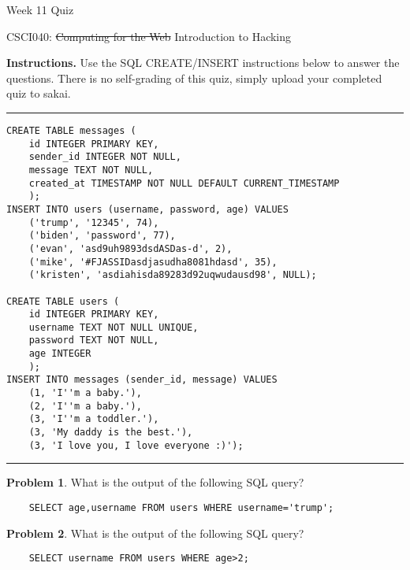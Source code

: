 \documentclass[10pt]{article}
\theoremstyle{definition}
\newtheorem{problem}{Problem}
\begin{document}
\begin{center}
    {
\Large
Week 11 Quiz
}

    \vspace{0.1in}
    CSCI040: \sout{Computing for the Web} Introduction to Hacking

    \vspace{0.1in}
\end{center}

\vspace{0.15in}
%
%

\noindent\textbf{Instructions.}
Use the SQL CREATE/INSERT instructions below to answer the questions.
There is no self-grading of this quiz,
simply upload your completed quiz to sakai.

\noindent
\rule{\textwidth}{1pt}
\begin{lstlisting}
CREATE TABLE messages (
    id INTEGER PRIMARY KEY,
    sender_id INTEGER NOT NULL,
    message TEXT NOT NULL,
    created_at TIMESTAMP NOT NULL DEFAULT CURRENT_TIMESTAMP
    );
INSERT INTO users (username, password, age) VALUES 
    ('trump', '12345', 74),
    ('biden', 'password', 77),
    ('evan', 'asd9uh9893dsdASDas-d', 2),
    ('mike', '#FJASSIDasdjasudha8081hdasd', 35),
    ('kristen', 'asdiahisda89283d92uqwudausd98', NULL);

CREATE TABLE users (
    id INTEGER PRIMARY KEY,
    username TEXT NOT NULL UNIQUE,
    password TEXT NOT NULL,
    age INTEGER
    );
INSERT INTO messages (sender_id, message) VALUES 
    (1, 'I''m a baby.'),
    (2, 'I''m a baby.'),
    (3, 'I''m a toddler.'),
    (3, 'My daddy is the best.'),
    (3, 'I love you, I love everyone :)');
\end{lstlisting}
\rule{\textwidth}{1pt}

\begin{problem}
    What is the output of the following SQL query?
    \begin{lstlisting}
    SELECT age,username FROM users WHERE username='trump';
    \end{lstlisting}
    \vspace{1in}
\end{problem}

\begin{problem}
    What is the output of the following SQL query?
    \begin{lstlisting}
    SELECT username FROM users WHERE age>2;
    \end{lstlisting}
    \vspace{1in}
\end{problem}
\end{document}
